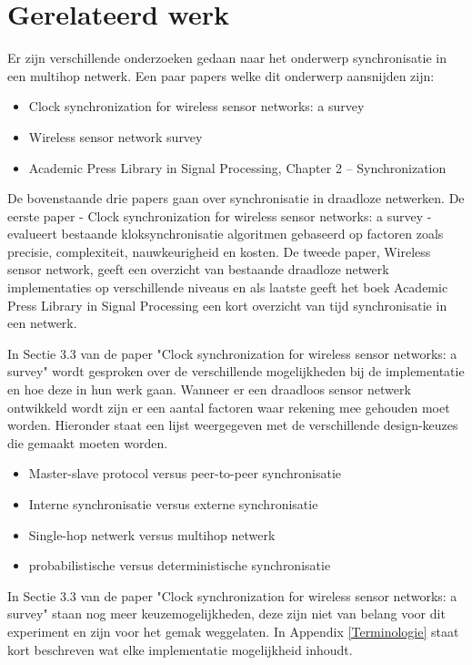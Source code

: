\documentclass{article}
\begin{document}
\section{Gerelateerd werk}
Er zijn verschillende onderzoeken gedaan naar het onderwerp synchronisatie in een multihop netwerk. 
Een paar papers welke dit onderwerp aansnijden zijn: 
\begin{itemize}
	\item Clock synchronization for wireless sensor networks: a survey
	\item Wireless sensor network survey
	\item Academic Press Library in Signal Processing, Chapter 2 – Synchronization
\end{itemize}
De bovenstaande drie papers gaan over synchronisatie in draadloze netwerken. De eerste paper - Clock synchronization for wireless sensor networks: a survey - evalueert bestaande kloksynchronisatie algoritmen gebaseerd op factoren zoals precisie, complexiteit, nauwkeurigheid en kosten. De tweede paper, Wireless sensor network, geeft een overzicht van bestaande draadloze netwerk implementaties op verschillende niveaus en als laatste geeft het boek Academic Press Library in Signal Processing een kort overzicht van tijd synchronisatie in een netwerk. 

In Sectie 3.3 van de paper "Clock synchronization for wireless sensor networks: a survey" wordt gesproken over de verschillende mogelijkheden bij de implementatie en hoe deze in hun werk gaan. 
Wanneer er een draadloos sensor netwerk ontwikkeld wordt zijn er een aantal factoren waar rekening mee gehouden moet worden. Hieronder staat een lijst weergegeven met de verschillende design-keuzes die gemaakt moeten worden.

\begin{itemize}
	\item Master-slave protocol versus peer-to-peer synchronisatie
	\item Interne synchronisatie versus externe synchronisatie
	\item Single-hop netwerk versus multihop netwerk
	\item probabilistische versus deterministische synchronisatie
\end{itemize}
In Sectie 3.3 van de paper "Clock synchronization for wireless sensor networks: a survey" staan nog meer keuzemogelijkheden, deze zijn niet van belang voor dit experiment en zijn voor het gemak weggelaten. 
In Appendix \ref{Terminologie} staat kort beschreven wat elke implementatie mogelijkheid inhoudt.
\newline
\end{document}
